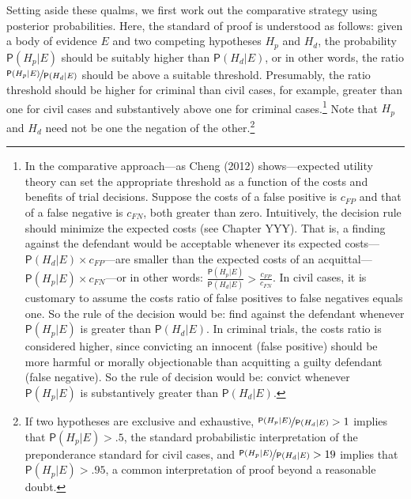 \documentclass[
  10pt,
  dvipsnames,enabledeprecatedfontcommands]{scrartcl}
\newcommand{\pr}[1]{\ensuremath{\mathsf{P}(#1)}}
\begin{document}
Setting aside these qualms, we first work out the comparative strategy
using posterior probabilities. Here, the standard of proof is understood
as follows: given a body of evidence \(E\) and two competing hypotheses
\(H_p\) and \(H_d\), the probability \(\pr{H_p \vert E}\) should be
suitably higher than \(\pr{H_d \vert E}\), or in other words, the ratio
\(\nicefrac{\pr{H_p \vert E}}{\pr{H_d \vert E}}\) should be above a
suitable threshold. Presumably, the ratio threshold should be higher for
criminal than civil cases, for example, greater than one for civil cases
and substantively above one for criminal cases.\footnote{In the
  comparative approach---as Cheng (2012) shows---expected utility theory
  can set the appropriate threshold as a function of the costs and
  benefits of trial decisions. Suppose the costs of a false positive is
  \(c_{FP}\) and that of a false negative is \(c_{FN}\), both greater
  than zero. Intuitively, the decision rule should minimize the expected
  costs (see Chapter YYY). That is, a finding against the defendant
  would be acceptable whenever its expected
  costs---\(\pr{H_d \vert E} \times c_{FP}\)---are smaller than the
  expected costs of an
  acquittal---\(\pr{H_p \vert E}\times c_{FN}\)---or in other words:
  \(\frac{\pr{H_p \vert E}}{\pr{H_d \vert E}} > \frac{c_{FP}}{c_{FN}}\).
  In civil cases, it is customary to assume the costs ratio of false
  positives to false negatives equals one. So the rule of the decision
  would be: find against the defendant whenever \(\pr{H_p \vert E}\) is
  greater than \(\pr{H_d \vert E}\). In criminal trials, the costs ratio
  is considered higher, since convicting an innocent (false positive)
  should be more harmful or morally objectionable than acquitting a
  guilty defendant (false negative). So the rule of decision would be:
  convict whenever \(\pr{H_p \vert E}\) is substantively greater than
  \(\pr{H_d \vert E}\).} Note that \(H_p\) and \(H_d\) need not be one
the negation of the other.\footnote{If two hypotheses are exclusive and
  exhaustive, \(\nicefrac{\pr{H_p \vert E}}{\pr{H_d \vert E}}>1\)
  implies that \(\pr{H_p \vert E}>.5\), the standard probabilistic
  interpretation of the preponderance standard for civil cases, and
  \(\nicefrac{\pr{H_p \vert E}}{\pr{H_d \vert E}}>19\) implies that
  \(\pr{H_p \vert E}>.95\), a common interpretation of proof beyond a
  reasonable doubt.}
\end{document}
